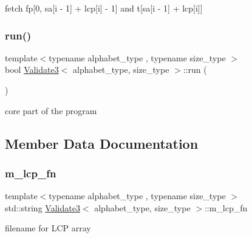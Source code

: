 fetch fp\mbox{[}0, sa\mbox{[}i -\/ 1\mbox{]} + lcp\mbox{[}i\mbox{]} -\/ 1\mbox{]} and t\mbox{[}sa\mbox{[}i -\/ 1\mbox{]} + lcp\mbox{[}i\mbox{]}\mbox{]} 

\mbox{\label{class_validate3_aaa21653a363d5adcc65b93ac34d22253}} 
\subsubsection{\texorpdfstring{run()}{run()}}
{\footnotesize\ttfamily template$<$typename alphabet\+\_\+type , typename size\+\_\+type $>$ \\
bool \hyperlink{class_validate3}{Validate3}$<$ alphabet\+\_\+type, size\+\_\+type $>$\+::run (\begin{DoxyParamCaption}{ }\end{DoxyParamCaption})\hspace{0.3cm}{\ttfamily [inline]}}



core part of the program 



\subsection{Member Data Documentation}
\mbox{\label{class_validate3_a9a5b2ec4499a2ce49c2697e5bc36c953}} 
\subsubsection{\texorpdfstring{m\+\_\+lcp\+\_\+fn}{m\_lcp\_fn}}
{\footnotesize\ttfamily template$<$typename alphabet\+\_\+type , typename size\+\_\+type $>$ \\
std\+::string \hyperlink{class_validate3}{Validate3}$<$ alphabet\+\_\+type, size\+\_\+type $>$\+::m\+\_\+lcp\+\_\+fn\hspace{0.3cm}{\ttfamily [private]}}



filename for L\+CP array 

\mbox{\label{class_validate3_a20a6a7a05819b0830e92e78c13954921}} 
